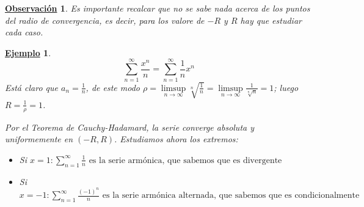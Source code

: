 \documentclass[10pt,a4paper,openright]{book}
\theoremstyle{break}
\newtheorem{obs}{\underline{Observación}}[chapter]
\newtheorem{ej}{\underline{Ejemplo}}[chapter]
\begin{document}
\begin{obs}
Es importante recalcar que no se sabe nada acerca de los puntos del radio de convergencia, es decir, para los valore de $-R$ y $R$ hay que estudiar cada caso.
\end{obs}

\begin{ej}
$$\sum_{n=1}^{\infty} \frac{x^n}{n} = \sum_{n=1}^{\infty} \frac{1}{n} x^n$$
Está claro que $a_n = \frac{1}{n}$, de este modo $\rho =  \underset{n \to \infty}\limsup \sqrt[n]{\frac{1}{n}} = \underset{n \to \infty}\limsup \frac{1}{\sqrt[n]{n}} = 1 $; luego $R = \frac{1}{\rho} = 1$.

Por el Teorema de Cauchy-Hadamard, la serie converge absoluta y uniformemente en $(-R, R)$. Estudiamos ahora los extremos:
\begin{itemize}
\item Si $x = 1 : \sum_{n=1}^{\infty} \frac{1}{n} \mbox{ es la serie armónica, que sabemos que es divergente }$

\item Si $x = -1: \sum_{n=1}^{\infty} \frac{(-1)^n}{n} \mbox{ es la serie armónica alternada, que sabemos que es condicionalmente convergente }$
\end{itemize}
\end{ej}
\end{document}
